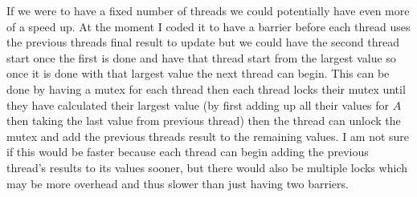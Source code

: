\documentclass{article}
\begin{document}
If we were to have a fixed number of threads we could potentially have even more of a speed up. At the moment I coded it to have a barrier before each thread uses the previous threads final result to update but we could have the second thread start once the first is done and have that thread start from the largest value so once it is done with that largest value the next thread can begin. This can be done by having a mutex for each thread then each thread locks their mutex until they have calculated their largest value (by first adding up all their values for $A$ then taking the last value from previous thread) then the thread can unlock the mutex and add the previous threads result to the remaining values. I am not sure if this would be faster because each thread can begin adding the previous thread's results to its values sooner, but there would also be multiple locks which may be more overhead and thus slower than just having two barriers.
\end{document}
